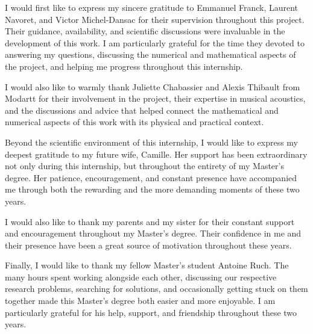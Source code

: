 \documentclass[11pt,a4paper]{report}
\theoremstyle{plain}
\theoremstyle{definition}
\begin{document}
I would first like to express my sincere gratitude to Emmanuel Franck,
Laurent Navoret, and Victor Michel-Dansac for their supervision throughout
this project. Their guidance, availability, and scientific discussions
were invaluable in the development of this work. I am particularly grateful
for the time they devoted to answering my questions, discussing the numerical
and mathematical aspects of the project, and helping me progress throughout
this internship.

I would also like to warmly thank Juliette Chabassier and Alexis Thibault
from Modartt for their involvement in the project, their expertise in musical
acoustics, and the discussions and advice that helped connect the mathematical
and numerical aspects of this work with its physical and practical context.

Beyond the scientific environment of this internship, I would like to express
my deepest gratitude to my future wife, Camille. Her support has been extraordinary not
only during this internship, but throughout the entirety of my Master's degree.
Her patience, encouragement, and constant presence have accompanied me through
both the rewarding and the more demanding moments of these two years.

I would also like to thank my parents and my sister for their constant support
and encouragement throughout my Master's degree. Their confidence in me and
their presence have been a great source of motivation throughout these years.

Finally, I would like to thank my fellow Master's student Antoine Ruch. The
many hours spent working alongside each other, discussing our respective
research problems, searching for solutions, and occasionally getting stuck on
them together made this Master's degree both easier and more enjoyable. I am
particularly grateful for his help, support, and friendship throughout these
two years.
\end{document}
